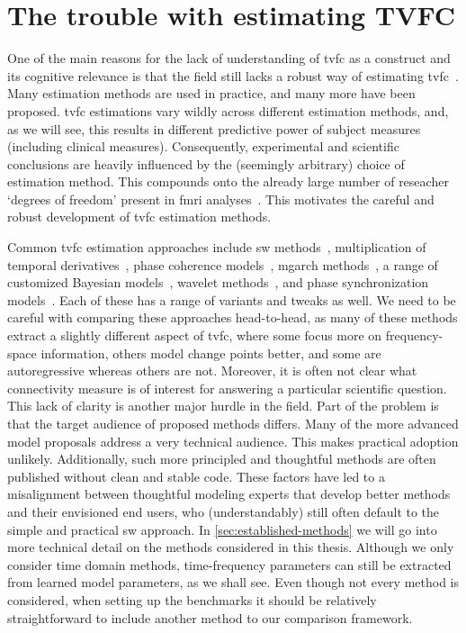 \clearpage
\section{The trouble with estimating TVFC}

One of the main reasons for the lack of understanding of \gls{tvfc} as a construct and its cognitive relevance is that the field still lacks a robust way of estimating \gls{tvfc}~\parencite{Foti2019, Lurie2020}.
Many estimation methods are used in practice, and many more have been proposed.
\gls{tvfc} estimations vary wildly across different estimation methods, and, as we will see, this results in different predictive power of subject measures (including clinical measures).
Consequently, experimental and scientific conclusions are heavily influenced by the (seemingly arbitrary) choice of estimation method.
This compounds onto the already large number of reseacher `degrees of freedom' present in \gls{fmri} analyses~\parencite{Gelman2013, Dafflon2022}.
This motivates the careful and robust development of \gls{tvfc} estimation methods.

Common \gls{tvfc} estimation approaches include \gls{sw} methods~\parencite{Sakoglu2010, Chang2010}, multiplication of temporal derivatives~\parencite{Shine2015}, phase coherence models~\parencite{Glerean2012}, \gls{mgarch} methods~\parencite{Lindquist2014, Choe2017, Xie2019}, a range of customized Bayesian models~\parencite[see e.g.][]{Taghia2017, Lan2017, Warnick2018, Li2019b, Ebrahimi2020}, wavelet methods~\parencite{Park2014, Zhang2016}, and phase synchronization models~\parencite{Varela2001, Glerean2012, Demirtas2016, Honari2021}.
Each of these has a range of variants and tweaks as well.
We need to be careful with comparing these approaches head-to-head, as many of these methods extract a slightly different aspect of \gls{tvfc}, where some focus more on frequency-space information, others model change points better, and some are autoregressive whereas others are not.
Moreover, it is often not clear what connectivity measure is of interest for answering a particular scientific question.
This lack of clarity is another major hurdle in the field.
%
Part of the problem is that the target audience of proposed methods differs.
Many of the more advanced model proposals address a very technical audience.
This makes practical adoption unlikely.
Additionally, such more principled and thoughtful methods are often published without clean and stable code.
These factors have led to a misalignment between thoughtful modeling experts that develop better methods and their envisioned end users, who (understandably) still often default to the simple and practical \gls{sw} approach.
%
In \cref{sec:established-methods} we will go into more technical detail on the methods considered in this thesis.
%
Although we only consider time domain methods, time-frequency parameters can still be extracted from learned model parameters, as we shall see.
Even though not every method is considered, when setting up the benchmarks it should be relatively straightforward to include another method to our comparison framework.


